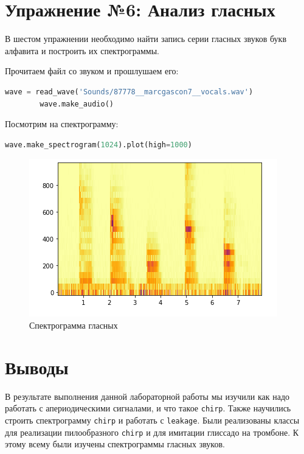\documentclass[a4paper, 14pt]{extarticle}
\begin{document}
    \section{Упражнение №6: Анализ гласных}
    \label{sec:6_vowels}

    В шестом упражнении необходимо найти запись серии гласных звуков букв алфавита и построить их спектрограммы.

    Прочитаем файл со звуком и прошлушаем его:

    \begin{lstlisting}[language=Python, caption= Чтение и прослушивание аудио, label={lst:read_audio}]
        wave = read_wave('Sounds/87778__marcgascon7__vocals.wav')
        wave.make_audio()
    \end{lstlisting}

    Посмотрим на спектрограмму:

    \begin{lstlisting}[language=Python, caption= Спектр пилообразного сигнала, label={lst:vowels_spectrogram}]
        wave.make_spectrogram(1024).plot(high=1000)
    \end{lstlisting}

    \begin{figure}[H]
        \centering
        \includegraphics[width=0.8\linewidth]{vowels_spectrogram}
        \caption{Спектрограмма гласных}
        \label{fig:vowels_spectrogram}
    \end{figure}


    \section{Выводы}
    \label{sec:conclusions}

    В результате выполнения данной лабораторной работы мы изучили как надо работать с апериодическими сигналами, и что такое \texttt{chirp}.
    Также научились строить спектрограмму \texttt{chirp} и работать с \texttt{leakage}.
    Были реализованы классы для реализации пилообразного \texttt{chirp} и для имитации глиссадо на тромбоне.
    К этому всему были изучены спектрограммы гласных звуков.
\end{document}
